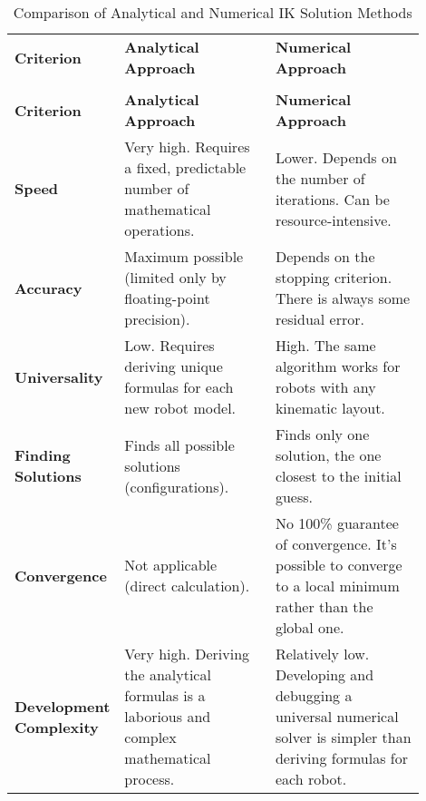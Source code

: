 \renewcommand{\arraystretch}{1.2} %
\begin{longtable}{p{0.15\linewidth} p{0.375\linewidth} p{0.375\linewidth}}
    \caption{Comparison of Analytical and Numerical IK Solution Methods}\label{tab:ik_solver_comparison}\\
    \toprule %
    \textbf{Criterion} & \textbf{Analytical Approach} & \textbf{Numerical Approach} \\
    \addlinespace[3pt] %
    \toprule %
    \endfirsthead

    \multicolumn{3}{c}{\tablename~\thetable{} -- continued from previous page} \\
    \toprule %
    \textbf{Criterion} & \textbf{Analytical Approach} & \textbf{Numerical Approach} \\
    \addlinespace[3pt] %
    \toprule %
    \endhead

    \bottomrule %
    \endfoot

    \bottomrule %
    \endlastfoot

    \textbf{Speed} & Very high. Requires a fixed, predictable number of mathematical operations. & Lower. Depends on the number of iterations. Can be resource-intensive. \\
    \midrule %
    \textbf{Accuracy} & Maximum possible (limited only by floating-point precision). & Depends on the stopping criterion. There is always some residual error. \\
    \midrule %
    \textbf{Universality} & Low. Requires deriving unique formulas for each new robot model. & High. The same algorithm works for robots with any kinematic layout. \\
    \midrule %
    \textbf{Finding Solutions} & Finds all possible solutions (configurations). & Finds only one solution, the one closest to the initial guess. \\
    \midrule %
    \textbf{Convergence} & Not applicable (direct calculation). & No 100\% guarantee of convergence. It's possible to converge to a local minimum rather than the global one. \\
    \midrule %
    \textbf{Development Complexity} & Very high. Deriving the analytical formulas is a laborious and complex mathematical process. & Relatively low. Developing and debugging a universal numerical solver is simpler than deriving formulas for each robot. \\
\end{longtable}

